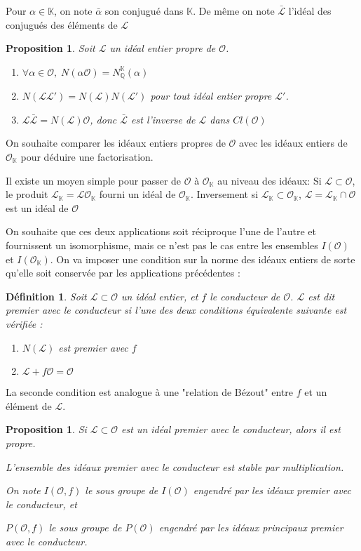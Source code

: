 \documentclass{article}
\newcommand{\Q}[0]{\mathbb{Q}}
\newcommand{\K}[0]{\mathbb{K}}
\newcommand{\OR}[0]{\mathcal{O}}
\newcommand{\LR}[0]{\mathcal{L}}
\newtheorem{Prop}[The]{Proposition}
\newtheorem{Def}[The]{Définition}
\begin{document}
Pour $\alpha\in\K$, on note $\bar{\alpha}$ son conjugué dans $\K$. De même on note $\bar{\LR}$ l'idéal des conjugués des éléments de $\LR$

\begin{Prop}
	Soit $\LR$ un idéal entier propre de $\OR$. 
	\begin{enumerate}
		\item $\forall\alpha\in\OR,\; N(\alpha\OR) = N_{\Q}^{\K}(\alpha)$
		\item $N(\LR\LR') = N(\LR)N(\LR')$ pour tout idéal entier propre $\LR'$.
		\item $\LR\bar{\LR} = N(\LR)\OR$, donc $\bar{\LR}$ est l'inverse de $\LR$ dans $Cl(\OR)$
	\end{enumerate}
\end{Prop}

On souhaite comparer les idéaux entiers propres de $\OR$ avec les idéaux entiers de $\OR_{\K}$ pour déduire une factorisation. 

Il existe un moyen simple pour passer de $\OR$ à $\OR_{\K}$ au niveau des idéaux: Si $\LR\subset\OR$, le produit $\LR_{\K} = \LR\OR_{\K}$ fourni un idéal de $\OR_{\K}$. Inversement si $\LR_{\K}\subset\OR_{\K}$, $\LR = \LR_{\K}\cap\OR$ est un idéal de $\OR$

On souhaite que ces deux applications soit réciproque l'une de l'autre et fournissent un isomorphisme, mais ce n'est pas le cas entre les ensembles $I(\OR)$ et $I(\OR_{\K})$. On va imposer une condition sur la norme des idéaux entiers de sorte qu'elle soit conservée par les applications précédentes :

\begin{Def}
	Soit $\LR\subset\OR$ un idéal entier, et $f$ le conducteur de $\OR$. $\LR$ est dit premier avec le conducteur si l'une des deux conditions équivalente suivante est vérifiée :
	\begin{enumerate}
		\item $N(\LR)$ est premier avec $f$
		\item $\LR + f\OR = \OR$
	\end{enumerate}
\end{Def}

La seconde condition est analogue à une "relation de Bézout" entre $f$ et un élément de $\LR$.

\begin{Prop}
	Si $\LR\subset\OR$ est un idéal premier avec le conducteur, alors il est propre.
	
	L'ensemble des idéaux premier avec le conducteur est stable par multiplication. 
	
	On note $I(\OR,f)$ le sous groupe de $I(\OR)$ engendré par les idéaux premier avec le conducteur, et
	
	$P(\OR,f)$ le sous groupe de $P(\OR)$ engendré par les idéaux principaux premier avec le conducteur. 
\end{Prop}
\end{document}
